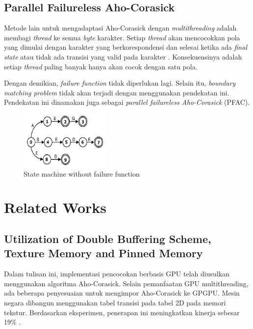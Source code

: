 \documentclass[conference]{IEEEtran}
\begin{document}
    \subsection{Parallel Failureless Aho-Corasick}
    Metode lain untuk mengadaptasi Aho-Corasick dengan \emph{multithreading} adalah membagi \emph{thread} ke semua \emph{byte} karakter. Setiap \emph{thread} akan mencocokkan pola yang dimulai dengan karakter yang berkorespondensi dan selesai ketika ada \emph{final state} atau tidak ada transisi yang valid pada karakter \cite{lin2013}. Konsekuensinya adalah setiap \emph{thread} paling banyak hanya akan cocok dengan satu pola.
    
    Dengan demikian, \emph{failure function} tidak diperlukan lagi. Selain itu, \emph{boundary matching problem} tidak akan terjadi dengan menggunakan pendekatan ini. Pendekatan ini dinamakan juga sebagai \emph{parallel failureless Aho-Corasick} (PFAC).

    \begin{figure}[htbp]
        \centerline{\includegraphics[width=0.4\textwidth]{../src/resources/pfac.png}}
        \caption{State machine without failure function}
    \end{figure} 

\section{Related Works}

    \subsection{Utilization of Double Buffering Scheme, Texture Memory and Pinned Memory}

        Dalam tulisan ini, implementasi pencocokan berbasis GPU telah diusulkan menggunakan algoritma Aho-Corasick. Selain pemanfaatan GPU multithreading, ada beberapa penyesuaian untuk mengimpor Aho-Corasick ke GPGPU. Mesin negara dibangun menggunakan tabel transisi pada tabel 2D pada memori tekstur. Berdasarkan eksperimen, penerapan ini meningkatkan kinerja sebesar 19\% \cite{gnort2008}.
        
\end{document}
